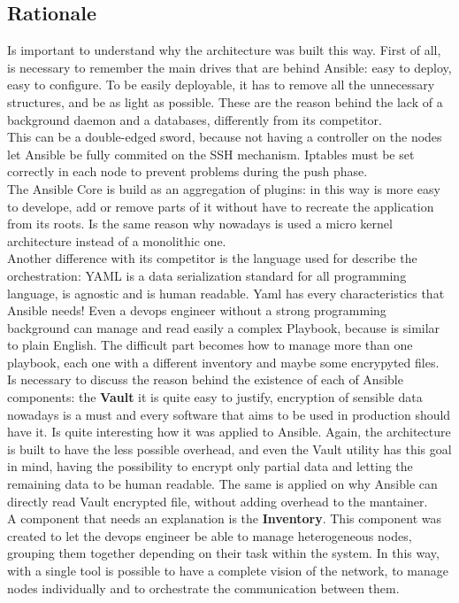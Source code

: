 \documentclass[conference]{IEEEtran}
\begin{document}
\subsection{Rationale}
Is important to understand why the architecture was built this way. First of all, is necessary to remember the main drives that are behind Ansible: easy to deploy, easy to configure. To be easily deployable, it has to remove all the unnecessary structures, and be as light as possible. These are the reason behind the lack of a background daemon and a databases, differently from its competitor.\\ This can be a double-edged sword, because not having a controller on the nodes let Ansible be fully commited on the SSH mechanism. Iptables must be set correctly in each node to prevent problems during the push phase.\\
The Ansible Core is build as an aggregation of plugins: in this way is more easy to develope, add or remove parts of it without have to recreate the application from its roots. Is the same reason why nowadays is used a micro kernel architecture instead of a monolithic one.\\
Another difference with its competitor is the language used for describe the orchestration: YAML is a data serialization standard for all programming language, is agnostic and is human readable. Yaml has every characteristics that Ansible needs! Even a devops engineer without a strong programming background can manage and read easily a complex Playbook, because is similar to plain English. The difficult part becomes how to manage more than one playbook, each one with a different inventory and maybe some encrypyted files.\\ 
Is necessary to discuss the reason behind the existence of each of Ansible components: the \textbf{Vault} it is quite easy to justify, encryption of sensible data nowadays is a must and every software that aims to be used in production should have it. Is quite interesting how it was applied to Ansible. Again, the architecture is built to have the less possible overhead, and even the Vault utility has this goal in mind, having the possibility to encrypt only partial data and letting the remaining data to be human readable. The same is applied on why Ansible can directly read Vault encrypted file, without adding overhead to the mantainer.\\
A component that needs an explanation is the \textbf{Inventory}. This component was created to let the devops engineer be able to manage heterogeneous nodes, grouping them together depending on their task within the system. In this way, with a single tool is possible to have a complete vision of the network, to manage nodes individually and to orchestrate the communication between them.\\
\end{document}
